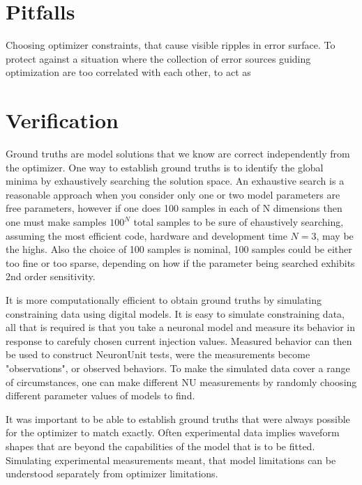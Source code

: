 \section{Pitfalls}
Choosing optimizer constraints, that cause visible ripples in error surface.
To protect against a situation where the collection of error sources guiding optimization are too correlated with each other, to act as 


\section{Verification}
Ground truths are model solutions that we know are correct independently from the optimizer. One way to establish ground truths is to identify the global minima by exhaustively searching the solution space. An exhaustive search is a reasonable approach when you consider only one or two model parameters are free parameters, however if one does 100 samples in each of N dimensions then one must make samples $100^{N}$ total samples to be sure of ehaustively searching, assuming the most efficient code, hardware and development time $N=3$, may be the highs.  Also the choice of 100 samples is nominal, 100 samples could be either too fine or too sparse, depending on how if the parameter being searched exhibits 2nd order sensitivity.

It is more computationally efficient to obtain ground truths by simulating constraining data using digital models. It is easy to simulate constraining data, all that is required is that you take a neuronal model and measure its behavior in response to carefuly chosen current injection values. Measured behavior can then be used to construct NeuronUnit tests, were the measurements become "observations", or observed behaviors. To make the simulated data cover a range of circumstances, one can make different NU measurements by randomly choosing different parameter values of models to find.

It was important to be able to establish ground truths that were always possible for the optimizer to match exactly. Often experimental data implies waveform shapes that are beyond the capabilities of the model that is to be fitted. Simulating experimental measurements meant, that model limitations can be understood separately from optimizer limitations.

